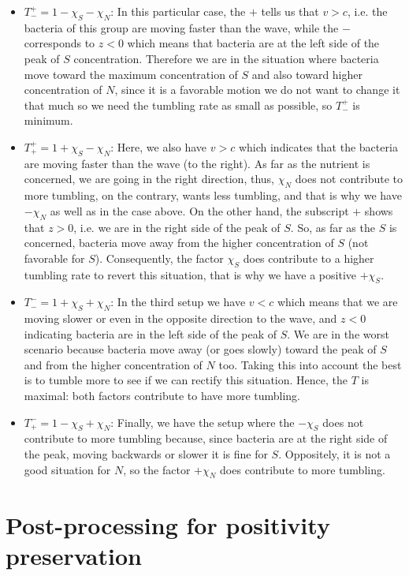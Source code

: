 \documentclass[11pt,twoside]{article}
\numberwithin{equation}{section}
\theoremstyle{plain}
\theoremstyle{nonumberplain}
\begin{document}
{\begin{itemize}
    \item $T^+_- = 1-\chi_S-\chi_N$: In this particular case, the $+$ tells us that $v>c$, i.e. the bacteria of this group are moving faster than the wave, while the $-$ corresponds to $z<0$ which means that bacteria are at the left side of the peak of $S$ concentration. Therefore we are in the situation where bacteria move toward the maximum concentration of $S$ and also toward higher concentration of $N$, since it is a favorable motion we do not want to change it that much so we need the tumbling rate as small as possible, so $T^+_-$ is minimum.
    \item $T^+_+ = 1+\chi_S-\chi_N$: Here, we also have $v>c$ which indicates that the bacteria are moving faster than the wave (to the right). As far as the nutrient is concerned, we are going in the right direction, thus, $\chi_N$ does not contribute to more tumbling, on the contrary, wants less tumbling, and that is why we have $-\chi_N$ as well as in the case above. On the other hand, the subscript $+$ shows that $z>0$, i.e. we are in the right side of the peak of $S$. So, as far as the $S$ is concerned, bacteria move away from the higher concentration of $S$ (not favorable for $S$). Consequently, the factor $\chi_S$ does contribute to a higher tumbling rate to revert this situation, that is why we have a positive $+\chi_S$.

    \item $T^-_- = 1+\chi_S+\chi_N$: In the third setup we have $v<c$ which means that we are moving slower or even in the opposite direction to the wave, and $z<0$ indicating bacteria are in the left side of the peak of $S$. We are in the worst scenario because bacteria move away (or goes slowly) toward the peak of $S$ and from the higher concentration of $N$ too. Taking this into account the best is to tumble more to see if we can rectify this situation. Hence, the $T$ is maximal: both factors contribute to have more tumbling.

    \item $T^-_+ = 1-\chi_S+\chi_N$: Finally, we have the setup where the $-\chi_S$ does not contribute to more tumbling because, since bacteria are at the right side of the peak, moving backwards or slower it is fine for $S$. Oppositely, it is not a good situation for $N$, so the factor $+\chi_N$ does contribute to more tumbling.
\end{itemize}
\fi

\section{Post-processing for positivity preservation}
\label{sec:limiter}

}
\end{document}
